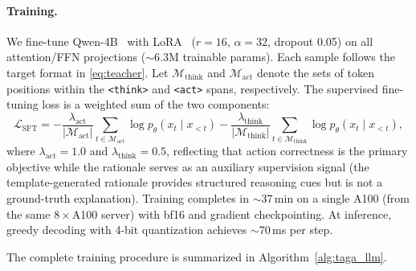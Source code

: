 \paragraph{Training.}
We fine-tune Qwen-4B~\cite{qwen2024} with LoRA~\cite{hu2022lora}
($r\!=\!16$, $\alpha\!=\!32$, dropout 0.05) on all attention/FFN projections
($\sim$6.3M trainable params).  Each sample follows the target format in
\eqref{eq:teacher}.  Let $\mathcal{M}_{\text{think}}$ and
$\mathcal{M}_{\text{act}}$ denote the sets of token positions within the
\texttt{<think>} and \texttt{<act>} spans, respectively.  The supervised
fine-tuning loss is a weighted sum of the two components:
\begin{equation}
  \mathcal{L}_{\text{SFT}}
  = -\frac{\lambda_{\text{act}}}{|\mathcal{M}_{\text{act}}|}
    \sum_{t \in \mathcal{M}_{\text{act}}} \log p_\theta(x_t \mid x_{<t})
    -\frac{\lambda_{\text{think}}}{|\mathcal{M}_{\text{think}}|}
    \sum_{t \in \mathcal{M}_{\text{think}}} \log p_\theta(x_t \mid x_{<t}),
  \label{eq:sft}
\end{equation}
where $\lambda_{\text{act}} \!=\! 1.0$ and
$\lambda_{\text{think}} \!=\! 0.5$, reflecting that action correctness is the
primary objective while the rationale serves as an auxiliary supervision signal
(the template-generated rationale provides structured reasoning cues but is not
a ground-truth explanation).
Training completes in $\sim$37\,min on a single A100 (from the same
$8\!\times\!$A100 server) with bf16 and gradient
checkpointing.  At inference, greedy decoding with 4-bit quantization achieves
$\sim$70\,ms per step.

The complete training procedure is summarized in Algorithm~\ref{alg:taga_llm}.

